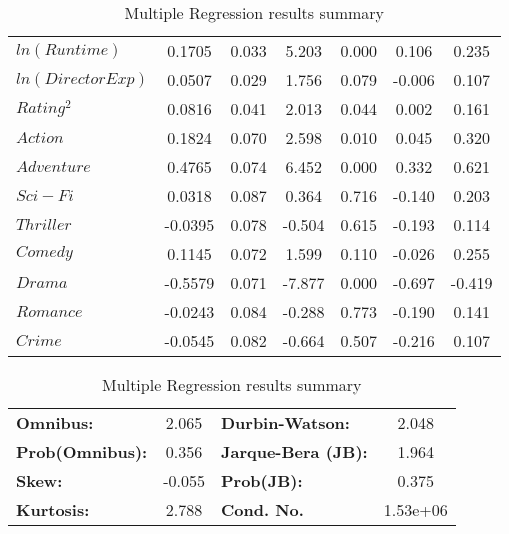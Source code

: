 \begin{table}[H]
\begin{center}
\begin{tabular}{lcccccc}
                \textbf{$ln(Runtime)$}          &       0.1705  &        0.033     &     5.203  &         0.000        &        0.106    &        0.235     \\
                \textbf{$ln(Director Exp)$}     &       0.0507  &        0.029     &     1.756  &         0.079        &       -0.006    &        0.107     \\
                \textbf{$Rating^2$}             &       0.0816  &        0.041     &     2.013  &         0.044        &        0.002    &        0.161     \\
                \textbf{$Action$}               &       0.1824  &        0.070     &     2.598  &         0.010        &        0.045    &        0.320     \\
                \textbf{$Adventure$}            &       0.4765  &        0.074     &     6.452  &         0.000        &        0.332    &        0.621     \\
                \textbf{$Sci-Fi$}               &       0.0318  &        0.087     &     0.364  &         0.716        &       -0.140    &        0.203     \\
                \textbf{$Thriller$}             &      -0.0395  &        0.078     &    -0.504  &         0.615        &       -0.193    &        0.114     \\
                \textbf{$Comedy$}               &       0.1145  &        0.072     &     1.599  &         0.110        &       -0.026    &        0.255     \\
                \textbf{$Drama$}                &      -0.5579  &        0.071     &    -7.877  &         0.000        &       -0.697    &       -0.419     \\
                \textbf{$Romance$}              &      -0.0243  &        0.084     &    -0.288  &         0.773        &       -0.190    &        0.141     \\
                \textbf{$Crime$}                &      -0.0545  &        0.082     &    -0.664  &         0.507        &       -0.216    &        0.107     \\
                \bottomrule
            \end{tabular}
            \begin{tabular}{lclc}
                \textbf{Omnibus:}       &  2.065 & \textbf{  Durbin-Watson:     } &    2.048  \\
                \textbf{Prob(Omnibus):} &  0.356 & \textbf{  Jarque-Bera (JB):  } &    1.964  \\
                \textbf{Skew:}          & -0.055 & \textbf{  Prob(JB):          } &    0.375  \\
                \textbf{Kurtosis:}      &  2.788 & \textbf{  Cond. No.          } & 1.53e+06  \\
            \bottomrule
            \end{tabular}
        \end{center}
        
        \caption[short]{Multiple Regression results summary}\label{tab:revenue-ols-summary}
    \end{table}
